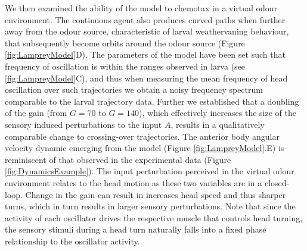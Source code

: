 \documentclass[11pt,a4paper]{article}
\begin{document}
We then examined the ability of the model to chemotax in a virtual odour environment. The continuous agent also produces curved paths when further away from the odour source, characteristic of larval weathervaning behaviour, that subsequently become orbits around the odour source (Figure \ref{fig:LampreyModel}D). The parameters of the model have been set such that frequency of oscillation is within the ranges observed in larva (see \ref{fig:LampreyModel}C), and thus when measuring the mean frequency of head oscillation over such trajectories we obtain a noisy frequency spectrum comparable to the larval trajectory data. Further we established that a doubling of the gain (from $G=70$ to $G=140$), which effectively increases the size of the sensory induced perturbations to the input $A$, results in a qualitatively comparable change to crossing-over trajectories. The anterior body angular velocity dynamic emerging from the model (Figure \ref{fig:LampreyModel}.E) is reminiscent of that observed in the experimental data (Figure \ref{fig:DynamicsExample}). The input perturbation perceived in the virtual odour environment relates to the head motion as these two variables are in a closed-loop. Change in the gain can result in increases head speed and thus sharper turns, which in turn results in larger sensory perturbations. Note that since the activity of each oscillator drives the respective muscle that controls head turning, the sensory stimuli during a head turn naturally falls into a fixed phase relationship to the oscillator activity.
\end{document}
